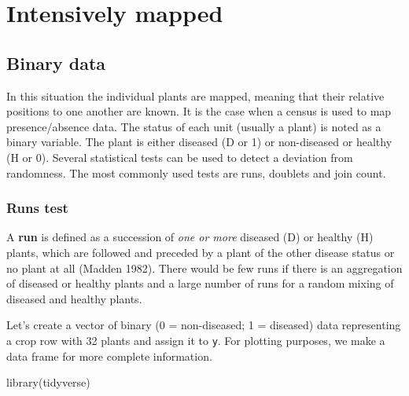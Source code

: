 \documentclass[
  letterpaper,
]{book}
\newenvironment{Shaded}{\begin{snugshade}}{\end{snugshade}}
\newcommand{\FunctionTok}[1]{\textcolor[rgb]{0.28,0.35,0.67}{#1}}
\newcommand{\NormalTok}[1]{\textcolor[rgb]{0.00,0.23,0.31}{#1}}
\begin{document}
\hypertarget{intensively-mapped}{%
\section{Intensively mapped}\label{intensively-mapped}}

\hypertarget{binary-data}{%
\subsection{Binary data}\label{binary-data}}

In this situation the individual plants are mapped, meaning that their
relative positions to one another are known. It is the case when a
census is used to map presence/absence data. The status of each unit
(usually a plant) is noted as a binary variable. The plant is either
diseased (D or 1) or non-diseased or healthy (H or 0). Several
statistical tests can be used to detect a deviation from randomness. The
most commonly used tests are runs, doublets and join count.

\hypertarget{runs-test}{%
\subsubsection{Runs test}\label{runs-test}}

A \textbf{run} is defined as a succession of \emph{one or more} diseased
(D) or healthy (H) plants, which are followed and preceded by a plant of
the other disease status or no plant at all (Madden 1982). There would
be few runs if there is an aggregation of diseased or healthy plants and
a large number of runs for a random mixing of diseased and healthy
plants.

Let's create a vector of binary (0 = non-diseased; 1 = diseased) data
representing a crop row with 32 plants and assign it to \texttt{y}. For
plotting purposes, we make a data frame for more complete information.

\begin{Shaded}
\begin{Highlighting}[]
\FunctionTok{library}\NormalTok{(tidyverse) }
\end{Highlighting}
\end{Shaded}
\end{document}
